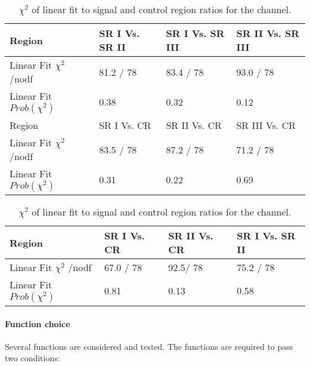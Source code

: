 \begin{table}[htbp]
\centering
\caption{$\chi^2$ of linear fit to signal and control region ratios for the \twocentral channel.}
\label{tab:mbb_lin_2cen-old}
\begin{tabular}{|l|l|l|l|}
\hline
Region                   & SR I Vs. SR II & SR I Vs. SR III & SR II Vs. SR III \\ \hline
Linear Fit $\chi^2$ /nodf & 81.2 / 78   & 83.4 / 78    & 93.0 / 78      \\ \hline
Linear Fit $Prob(\chi^2)$ & 0.38         & 0.32           & 0.12              \\ \hline
Region                   & SR I Vs. CR & SR II Vs. CR & SR III Vs. CR \\ \hline
Linear Fit $\chi^2$ /nodf & 83.5 / 78   & 87.2 / 78    & 71.2 / 78      \\ \hline
Linear Fit $Prob(\chi^2)$ & 0.31         & 0.22           & 0.69              \\ \hline
\end{tabular}
\end{table}


\begin{table}[htbp]
\centering
\caption{$\chi^2$ of linear fit to signal and control region ratios for the \fourcentral channel.}
\label{tab:mbb_lin_4cen-old}
\begin{tabular}{|l|l|l|l|}
\hline
Region                   & SR I Vs. CR & SR II Vs. CR & SR I Vs. SR II \\ \hline
Linear Fit $\chi^2$ /nodf & 67.0 / 78   & 92.5/ 78    & 75.2 / 78      \\ \hline
Linear Fit $Prob(\chi^2)$ & 0.81         & 0.13           & 0.58              \\ \hline
\end{tabular}
\end{table}

\paragraph{Function choice}

Several functions are considered and tested. The functions are required to pass two conditions:

